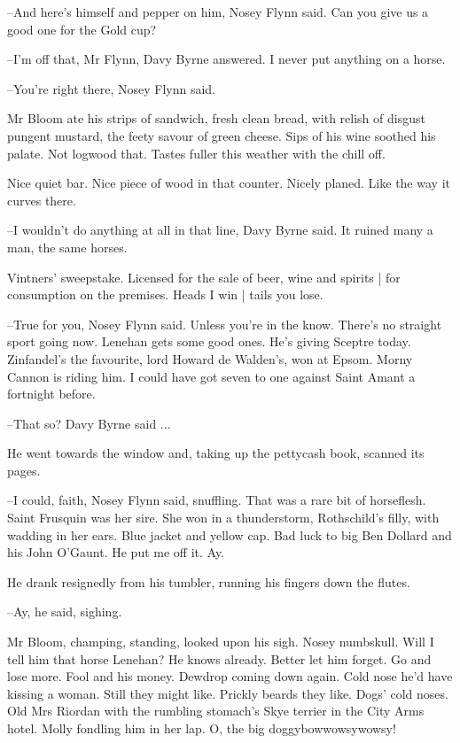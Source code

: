 --And here's himself and pepper on him,
Nosey Flynn said.
Can you give us a good one for the Gold cup?

--I'm off that, Mr Flynn,
Davy Byrne answered.
I never put anything on a horse.

--You're right there,
Nosey Flynn said.

Mr Bloom ate his strips of sandwich,
fresh clean bread,
with relish of disgust pungent mustard,
the feety savour of green cheese.
Sips of his wine soothed his palate.
Not logwood that.
Tastes fuller this weather with the chill off.

Nice quiet bar.
Nice piece of wood in that counter.
Nicely planed.
Like the way it curves there.

--I wouldn't do anything at all in that line,
Davy Byrne said.
It ruined many a man,
the same horses.

Vintners' sweepstake.
Licensed for the sale of beer, wine and spirits |
for consumption on the premises.
Heads I win |
tails you lose.

--True for you,
Nosey Flynn said.
Unless you're in the know.
There's no straight sport going now.
Lenehan gets some good ones.
He's giving Sceptre today.
Zinfandel's the favourite,
lord Howard de Walden's,
won at Epsom.
Morny Cannon is riding him.
I could have got seven to one against Saint Amant a fortnight before.

--That so?
Davy Byrne said ...

He went towards the window and,
taking up the pettycash book,
scanned its pages.

--I could, faith,
Nosey Flynn said, snuffling.
That was a rare bit of horseflesh.
Saint Frusquin was her sire.
She won in a thunderstorm,
Rothschild's filly,
with wadding in her ears.
Blue jacket and yellow cap.
Bad luck to big Ben Dollard and his John O'Gaunt.
He put me off it.
Ay.

He drank resignedly from his tumbler,
running his fingers down the flutes.

--Ay,
he said, sighing.

Mr Bloom,
champing, standing,
looked upon his sigh.
Nosey numbskull.
Will I tell him that horse Lenehan?
He knows already.
Better let him forget.
Go and lose more.
Fool and his money.
Dewdrop coming down again.
Cold nose he'd have kissing a woman.
Still they might like.
Prickly beards they like.
Dogs' cold noses.
Old Mrs Riordan with the rumbling stomach's Skye terrier in the City Arms hotel.
Molly fondling him in her lap.
O, the big doggybowwowsywowsy!

